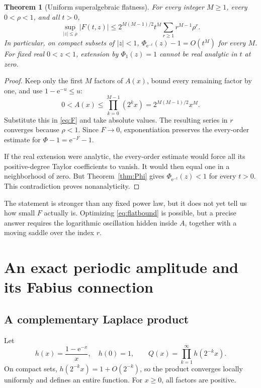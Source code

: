 \documentclass[11pt,oneside]{article}
\numberwithin{equation}{section}
\newtheorem{theorem}{Theorem}[section]
\theoremstyle{definition}
\theoremstyle{remark}
\newcommand{\e}{\mathrm e}
\begin{document}
\begin{theorem}[Uniform superalgebraic flatness]
\label{thm:flat}
For every integer \(M\ge1\), every \(0<\rho<1\), and all \(t>0\),
\begin{equation}
 \sup_{|z|\le\rho}|F(t,z)|
 \le 2^{M(M-1)/2}t^M\sum_{r\ge1}r^{M-1}\rho^r.
 \label{eq:flatbound}
\end{equation}
In particular, on compact subsets of \(|z|<1\),
\(\Phi_{\e^{-t}}(z)-1=O(t^M)\) for every \(M\). For fixed real \(0<z<1\),
extension by \(\Phi_1(z)=1\) cannot be real analytic in \(t\) at zero.
\end{theorem}
\begin{proof}
Keep only the first \(M\) factors of \(A(x)\), bound every remaining factor
by one, and use \(1-\e^{-u}\le u\):
\begin{equation}
 0<A(x)\le\prod_{k=0}^{M-1}(2^kx)
             =2^{M(M-1)/2}x^M.
 \label{eq:Abound}
\end{equation}
Substitute this in \eqref{eq:F} and take absolute values. The resulting series
in \(r\) converges because \(\rho<1\). Since \(F\to0\), exponentiation
preserves the every-order estimate for \(\Phi-1=\e^{-F}-1\).

If the real extension were analytic, the every-order estimate would force
all its positive-degree Taylor coefficients to vanish. It would then equal
one in a neighborhood of zero. But Theorem~\ref{thm:Phi} gives
\(\Phi_{\e^{-t}}(z)<1\) for every \(t>0\). This contradiction proves
nonanalyticity.
\end{proof}

The statement is stronger than any fixed power law, but it does not yet tell
us how small \(F\) actually is. Optimizing \eqref{eq:flatbound} is possible,
but a precise answer requires the logarithmic oscillation hidden inside
\(A\), together with a moving saddle over the index \(r\).

\section{An exact periodic amplitude and its Fabius connection}
\label{sec:periodic}

\subsection{A complementary Laplace product}
Let
\begin{equation}
 h(x)=\frac{1-\e^{-x}}x,\quad h(0)=1,\qquad
 Q(x)=\prod_{k=1}^{\infty}h(2^{-k}x).
 \label{eq:Q}
\end{equation}
On compact sets, \(h(2^{-k}x)=1+O(2^{-k})\), so the product converges
locally uniformly and defines an entire function. For \(x\ge0\), all factors
are positive.
\end{document}

